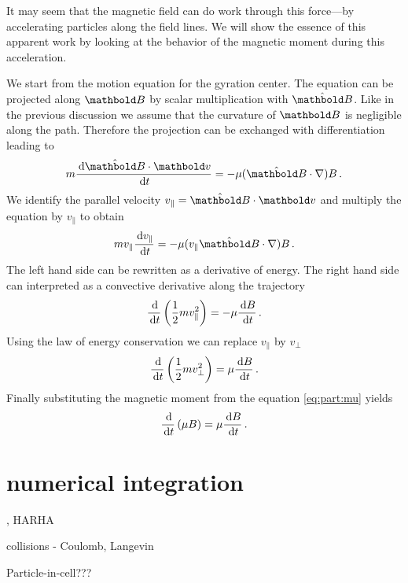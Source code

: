 It may seem that the magnetic field can do work through this
force---by accelerating particles along the field lines. We will show the
essence of this apparent work by looking at the behavior of the magnetic
moment during this acceleration.

We start from the motion equation for the gyration center. The equation
can be projected along $\mb B$ by scalar multiplication with $\hat{\mb B}$.
Like in the previous discussion we assume that the curvature of $\mb B$ is
negligible along the path. Therefore the projection can be exchanged with
differentiation leading to
\begin{equation}
    m\frac{\de{\hat{\mb B}\cdot\mb v}}{\de t}  =
    -\mu(\hat {\mb B}\cdot\nabla)B\,.
\end{equation}
We identify the parallel velocity $v_\| = \hat{\mb B}\cdot\mb v$ and multiply
the equation by $v_\|$ to obtain
\begin{equation}
    mv_\|\frac{\de{v_\|}}{\de t}  =
    -\mu (v_\|\hat {\mb B}\cdot\nabla)B\,.
\end{equation}
The left hand side can be rewritten as a derivative of energy. The right hand
side can interpreted as a convective derivative along the trajectory
\begin{equation}
    \frac{{\,\text{d}}}{{\,\text{d}} t}\left(\frac{1}{2}mv_\|^2\right)  =
    -\mu \frac{{\,\text{d}} B}{{\,\text{d}} t}\,.
\end{equation}
Using the law of energy conservation we can replace $v_\|$ by $v_\perp$
\begin{equation}
    \frac{{\,\text{d}}}{{\,\text{d}} t}\left(\frac{1}{2}mv_\perp^2\right)  =
    \mu \frac{{\,\text{d}} B}{{\,\text{d}} t}\,.
\end{equation}
Finally substituting the magnetic moment from the equation \eqref{eq:part:mu}
yields
\begin{equation}
    \frac{{\,\text{d}}}{{\,\text{d}} t}\left(\mu B\right)  =
    \mu \frac{{\,\text{d}} B}{{\,\text{d}} t}\,.
\end{equation}








\section{numerical integration}, HARHA

collisions - Coulomb, Langevin

Particle-in-cell???
